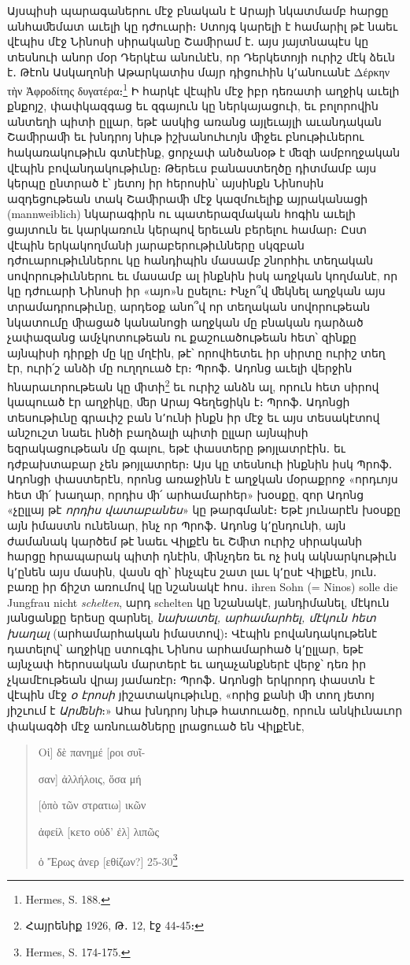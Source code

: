 \documentclass{article}
\begin{document}
{Այսպիսի պարագաներու մէջ բնական է Արայի նկատմամբ հարցը անհաﬔմատ աւելի կը դժուարի։ Ստոյգ կարելի է համարիլ թէ նաեւ վէպիս մէջ Նինոսի սիրականը Շաﬕրամ է․ այս յայտնապէս կը տեսնուի անոր մօր Դերկէա անունէն, որ Դերկետոյի ուրիշ մէկ ձեւն է․ Թէոն Ասկաղոնի Աթարկատիս մայր դիցուհին կ՚անուանէ Δέρκην τὴν Ἀφροδίτης δυγατέρα։\footnote{Hermes, S. 188.} Ի հարկէ վէպին մէջ իբր դեռատի աղջիկ աւելի քնքոյշ, փափկազգաց եւ զգայուն կը ներկայացուի, եւ բոլորովին անտեղի պիտի ըլլար, եթէ ասկից առանց այլեւայլի աւանդական Շաﬕրաﬕ եւ խնդրոյ նիւթ իշխանուհւոյն ﬕջեւ բնութիւներու հակառակութիւն գտնէինք, ցորչափ անծանօթ է ﬔզի ամբողջական վէպին բովանդակութիւնը։ Թերեւս բանաստեղծը դիտմամբ այս կերպը ընտրած է՝ յետոյ իր հերոսին՝ այսինքն Նինոսին ազդեցութեան տակ Շաﬕրաﬕ մէջ կազմուելիք այրականացի (mannweiblich) նկարագիրն ու պատերազմական հոգին աւելի ցայտուն եւ կարկառուն կերպով երեւան բերելու համար։ Ըստ վէպին երկակողմանի յարաբերութիւնները սկզբան դժուարութիւններու կը հանդիպին մասամբ շնորհիւ տեղական սովորութիւններու եւ մասամբ ալ ինքնին իսկ աղջկան կողմանէ, որ կը դժուարի Նինոսի իր «այո»ն ըսելու։ Ինչո՞վ ﬔկնել աղջկան այս տրամադրութիւնը, արդեօք անո՞վ որ տեղական սովորութեան նկատումը ﬕացած կանանոցի աղջկան մը բնական դարձած չափազանց ամչկոտութեան ու քաշուածութեան հետ՝ զինքը այնպիսի դիրքի մը կը մղէին, թէ՝ որովհետեւ իր սիրտը ուրիշ տեղ էր, ուրի՛շ անձի մը ուղղուած էր։ Պրոֆ․ Ադոնց աւելի վերջին հնարաւորութեան կը ﬕտի\footnote{Հայրենիք 1926, Թ․ 12, էջ 44֊45։} եւ ուրիշ անձն ալ, որուն հետ սիրով կապուած էր աղջիկը, ﬔր Արայ Գեղեցիկն է։ Պրոֆ․ Ադոնցի տեսութիւնը գրաւիշ բան ն՚ունի ինքն իր մէջ եւ այս տեսակէտով անշուշտ նաեւ ինծի բաղձալի պիտի ըլլար այնպիսի եզրակացութեան մը գալու, եթէ փաստերը թոյլատրէին․ եւ դժբախտաբար չեն թոյլատրեր։ Այս կը տեսնուի ինքնին իսկ Պրոֆ․ Ադոնցի փաստերէն, որոնց առաջինն է աղջկան մօրաքրոջ «որդւոյս հետ ﬕ՛ խաղար, որդիս ﬕ՛ արհամարհեր» խօսքը, զոր Ադոնց «չըլլայ թէ \emph{որդիս վատաբանես}» կը թարգմանէ։ Եթէ յունարէն խօսքը այն իմաստն ունենար, ինչ որ Պրոֆ․ Ադոնց կ՚ընդունի, այն ժամանակ կարծեմ թէ նաեւ Վիլքէն եւ Շﬕտ ուրիշ սիրականի հարցը հրապարակ պիտի դնէին, ﬕնչդեռ եւ ոչ իսկ ակնարկութիւն կ՚ընեն այս մասին, վասն զի՝ ինչպէս շատ լաւ կ՚ըսէ Վիլքէն, յուն․ բառը իր ճիշտ առումով կը նշանակէ հոս․ ihren Sohn (= Ninos) solle die Jungfrau nicht \emph{schelten}, արդ schelten կը նշանակէ, յանդիմանել, մէկուն յանցանքը երեսը զարնել, \emph{նախատել, արհամարհել, մէկուն հետ խաղալ} (արհամարհական իմաստով)։ Վէպին բովանդակութենէ դատելով՝ աղջիկը ստուգիւ Նինոս արհամարհած կ՚ըլլար, եթէ այնչափ հերոսական մարտերէ եւ աղաչանքներէ վերջ՝ դեռ իր չկամէութեան վրայ յամառէր։ Պրոֆ․ Ադոնցի երկրորդ փաստն է վէպին մէջ \emph{օ էրոսի} յիշատակութիւնը, «որից քանի ﬕ տող յետոյ յիշւում է \emph{Արﬔնի}։» Ահա խնդրոյ նիւթ հատուածը, որուն անկիւնաւոր փակագծի մէջ առնուածները լրացուած են Վիլքէնէ,}
\begin{quotation}
\small
Οἱ] δὲ πανημέ [ροι συῖ-

σαν] ἀλλήλοις, ὅσα μή

[ὁπὸ τῶν στρατιω] ικῶν

ἀφείλ [κετο οὐδ' ἐλ] λιπῶς

ὁ Ἔρως ἀνερ [εθίζων?]  25-30\footnote{Hermes, S. 174-175.}
\end{quotation}
\end{document}

